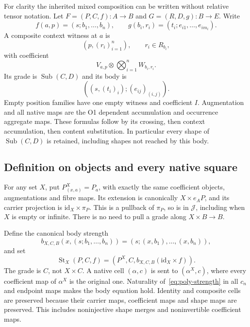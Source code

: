 \documentclass[11pt,a4paper]{article}
\theoremstyle{definition}
\newcommand{\J}{\mathcal J}
\newcommand{\id}{\mathrm{id}}
\newcommand{\st}{\operatorname{St}}
\newcommand{\Sub}{\operatorname{Sub}}
\begin{document}
For clarity the inherited mixed composition can be written without relative
tensor notation. Let $F=(P,C,f):A\to B$ and $G=(R,D,g):B\to E$. Write
\[
 f(a,p)=(s;b_1,\ldots,b_n),\qquad
 g(b_i,r_i)=(t_i;e_{i1},\ldots,e_{im_i}).
\]
A composite context witness at $a$ is
\begin{equation}\label{eq:composite-witness}
 (p,(r_i)_{i=1}^n),\qquad r_i\in R_{b_i},
\end{equation}
with coefficient
\begin{equation}\label{eq:composite-coeff}
 V_{a,p}\otimes\bigotimes_{i=1}^n W_{b_i,r_i}.
\end{equation}
Its grade is $\Sub(C,D)$ and its body is
\begin{equation}\label{eq:composite-body}
 ((s,(t_i)_i);(e_{ij})_{(i,j)}).
\end{equation}
Empty position families have one empty witness and coefficient $I$.
Augmentation and all native maps are the O1 dependent accumulation and
occurrence aggregate maps. These formulas follow by its crossing, then
context accumulation, then content substitution. In particular every shape
of $\Sub(C,D)$ is retained, including shapes not reached by this body.

\subsection{Definition on objects and every native square}
For any set $X$, put $P^X_{(x,a)}=P_a$, with exactly the same coefficient
objects, augmentations and fibre maps. Its extension is canonically
$X\times e_AP$, and its carrier projection is $\id_X\times\pi_P$.
This is a pullback of $\pi_P$, so is in $\J$, including when $X$ is empty
or infinite. There is no need to pull a grade along $X\times B\to B$.

Define the canonical body strength
\begin{equation}\label{eq:poly-strength}
 b_{X,C,B}(x,(s;b_1,\ldots,b_n))
       =(s;(x,b_1),\ldots,(x,b_n)),
\end{equation}
and set
\[
 \st_X(P,C,f)=(P^X,C,b_{X,C,B}(\id_X\times f)).
\]
The grade is $C$, not $X\times C$. A native cell $(\alpha,c)$ is sent to
$(\alpha^X,c)$, where every coefficient map of $\alpha^X$ is the original
one. Naturality of~\eqref{eq:poly-strength} in all $c_n$ and endpoint maps
makes the body equation hold. Identity and composite cells are preserved
because their carrier maps, coefficient maps and shape maps are preserved.
This includes noninjective shape merges and noninvertible coefficient maps.
\end{document}
